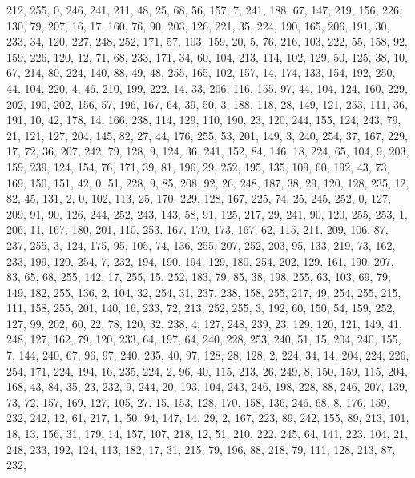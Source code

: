 \begin{DoxyCode}
       212, 255, 0, 246, 241, 211, 48, 25, 68, 56, 157, 7, 241, 188, 67, 147, 219, 156, 226, 130, 79, 207, 16, 17,
       160, 76, 90, 203, 126, 221, 35, 224, 190, 165, 206, 191, 30, 233, 34, 120, 227, 248, 252, 171, 57, 103, 159,
       20, 5, 76, 216, 103, 222, 55, 158, 92, 159, 226, 120, 12, 71, 68, 233, 171, 34, 60, 104, 213, 114, 102, 129,
       50, 125, 38, 10, 67, 214, 80, 224, 140, 88, 49, 48, 255, 165, 102, 157, 14, 174, 133, 154, 192, 250, 44,
       104, 220, 4, 46, 210, 199, 222, 14, 33, 206, 116, 155, 97, 44, 104, 124, 160, 229, 202, 190, 202, 156, 57, 196,
       167, 64, 39, 50, 3, 188, 118, 28, 149, 121, 253, 111, 36, 191, 10, 42, 178, 14, 166, 238, 114, 129, 110,
       190, 23, 120, 244, 155, 124, 243, 79, 21, 121, 127, 204, 145, 82, 27, 44, 176, 255, 53, 201, 149, 3, 240, 254,
       37, 167, 229, 17, 72, 36, 207, 242, 79, 128, 9, 124, 36, 241, 152, 84, 146, 18, 224, 65, 104, 9, 203, 159,
       239, 124, 154, 76, 171, 39, 81, 196, 29, 252, 195, 135, 109, 60, 192, 43, 73, 169, 150, 151, 42, 0, 51, 228,
       9, 85, 208, 92, 26, 248, 187, 38, 29, 120, 128, 235, 12, 82, 45, 131, 2, 0, 102, 113, 25, 170, 229, 128,
       167, 225, 74, 25, 245, 252, 0, 127, 209, 91, 90, 126, 244, 252, 243, 143, 58, 91, 125, 217, 29, 241, 90, 120,
       255, 253, 1, 206, 11, 167, 180, 201, 110, 253, 167, 170, 173, 167, 62, 115, 211, 209, 106, 87, 237, 255, 3,
       124, 175, 95, 105, 74, 136, 255, 207, 252, 203, 95, 133, 219, 73, 162, 233, 199, 120, 254, 7, 232, 194, 190,
       194, 129, 180, 254, 202, 129, 161, 190, 207, 83, 65, 68, 255, 142, 17, 255, 15, 252, 183, 79, 85, 38, 198,
       255, 63, 103, 69, 79, 149, 182, 255, 136, 2, 104, 32, 254, 31, 237, 238, 158, 255, 217, 49, 254, 255, 215,
       111, 158, 255, 201, 140, 16, 233, 72, 213, 252, 255, 3, 192, 60, 150, 54, 159, 252, 127, 99, 202, 60, 22, 78,
       120, 32, 238, 4, 127, 248, 239, 23, 129, 120, 121, 149, 41, 248, 127, 162, 79, 120, 233, 64, 197, 64, 240,
       228, 253, 240, 51, 15, 204, 240, 155, 7, 144, 240, 67, 96, 97, 240, 235, 40, 97, 128, 28, 128, 2, 224, 34,
       14, 204, 224, 226, 254, 171, 224, 194, 16, 235, 224, 2, 96, 40, 115, 213, 26, 249, 8, 150, 159, 115, 204,
       168, 43, 84, 35, 23, 232, 9, 244, 20, 193, 104, 243, 246, 198, 228, 88, 246, 207, 139, 73, 72, 157, 169, 127,
       105, 27, 15, 153, 128, 170, 158, 136, 246, 68, 8, 176, 159, 232, 242, 12, 61, 217, 1, 50, 94, 147, 14, 29, 2,
       167, 223, 89, 242, 155, 89, 213, 101, 18, 13, 156, 31, 179, 14, 157, 107, 218, 12, 51, 210, 222, 245, 64,
       141, 223, 104, 21, 248, 233, 192, 124, 113, 182, 17, 31, 215, 79, 196, 88, 218, 79, 111, 128, 213, 87, 232,

\end{DoxyCode}

